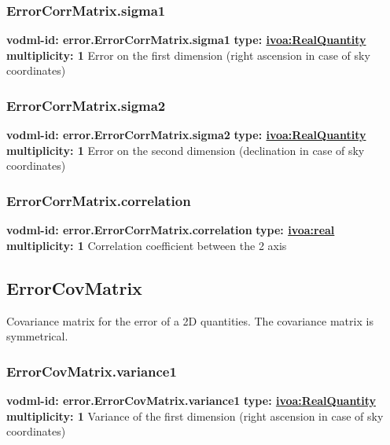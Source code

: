     \subsubsection{ErrorCorrMatrix.sigma1}
    \textbf{vodml-id: error.ErrorCorrMatrix.sigma1} \newline
    \textbf{type: \hyperref[sect:ivoa]{ivoa:RealQuantity}} \newline
    \textbf{multiplicity: 1} \newline
    Error on the first dimension (right ascension in case of sky coordinates)

    \subsubsection{ErrorCorrMatrix.sigma2}
    \textbf{vodml-id: error.ErrorCorrMatrix.sigma2} \newline
    \textbf{type: \hyperref[sect:ivoa]{ivoa:RealQuantity}} \newline
    \textbf{multiplicity: 1} \newline
    Error on the second dimension (declination in case of sky coordinates)

    \subsubsection{ErrorCorrMatrix.correlation}
    \textbf{vodml-id: error.ErrorCorrMatrix.correlation} \newline
    \textbf{type: \hyperref[sect:ivoa]{ivoa:real}} \newline
    \textbf{multiplicity: 1} \newline
    Correlation coefficient between the 2 axis

  \subsection{ErrorCovMatrix}
    \label{sect:error.ErrorCovMatrix}
    Covariance matrix for the error of a 2D quantities. The covariance matrix is symmetrical.

    \subsubsection{ErrorCovMatrix.variance1}
    \textbf{vodml-id: error.ErrorCovMatrix.variance1} \newline
    \textbf{type: \hyperref[sect:ivoa]{ivoa:RealQuantity}} \newline
    \textbf{multiplicity: 1} \newline
    Variance of the first dimension (right ascension in case of sky coordinates)

